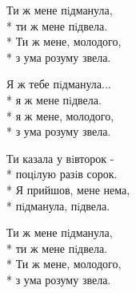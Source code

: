 \medskip

\begin{minipage}{\linewidth}
\hspace*{1.5em}Ти ж мене пiдманула,\\*
\hspace*{1.5em}ти ж мене пiдвела.\\*
\hspace*{1.5em}Ти ж мене, молодого,\\*
\hspace*{1.5em}з ума розуму звела.\\
\end{minipage}\par\medskip\nobreak

\medskip

\begin{minipage}{\linewidth}
\hspace*{1.5em}Я ж тебе пiдманула...\\*
\hspace*{1.5em}я ж мене пiдвела.\\*
\hspace*{1.5em}я ж мене, молодого,\\*
\hspace*{1.5em}з ума розуму звела.\\
\end{minipage}\par\medskip\nobreak

\medskip

\begin{minipage}{\linewidth}
Ти казала у вiвторок -\\*
поцiлую разiв сорок.\\*
Я прийшов, мене нема,\\*
пiдманула, пiдвела.\\
\end{minipage}\par\medskip\nobreak

\medskip

\begin{minipage}{\linewidth}
\hspace*{1.5em}Ти ж мене пiдманула,\\*
\hspace*{1.5em}ти ж мене пiдвела.\\*
\hspace*{1.5em}Ти ж мене, молодого,\\*
\hspace*{1.5em}з ума розуму звела.\\
\end{minipage}\par\medskip\nobreak

